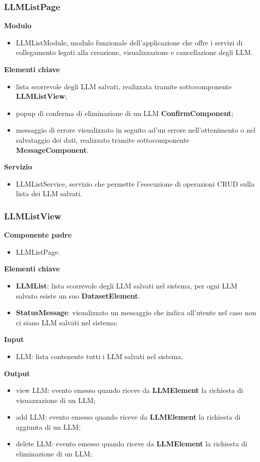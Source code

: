 \subsubsection{LLMListPage}
\textbf{Modulo}
\begin{itemize}
    \item LLMListModule, modulo funzionale dell'applicazione che offre i servizi di collegamento legati alla creazione, visualizzazione e cancellazione degli LLM. 
\end{itemize}
\textbf{Elementi chiave}
\begin{itemize}
    \item lista scorrevole degli LLM salvati, realizzata tramite sottocomponente \textbf{LLMListView};
    \item popup di conferma di eliminazione di un LLM \textbf{ConfirmComponent};
    \item messaggio di errore visualizzato in seguito ad'un errore nell'ottenimento o nel salvataggio dei dati, realizzato tramite sottocomponente \textbf{MessageComponent}.
\end{itemize}
\textbf{Servizio} \\
\begin{itemize}
    \item LLMListService, servizio che permette l'esecuzione di operazioni CRUD sulla lista dei LLM salvati.
\end{itemize}

\subsubsection{LLMListView}
\textbf{Componente padre}
\begin{itemize}
    \item LLMListPage.
\end{itemize}
\textbf{Elementi chiave}
\begin{itemize}
    \item \textbf{LLMList}: lista scorrevole degli LLM salvati nel sistema, per ogni LLM salvato esiste un suo \textbf{DatasetElement}.
    \item \textbf{StatusMessage}: visualizzato un messaggio che indica all'utente nel caso non ci siano LLM salvati nel sistema;
\end{itemize}
\textbf{Input}
\begin{itemize}
    \item LLM: lista contenente tutti i LLM salvati nel sistema.
\end{itemize}
\textbf{Output}
\begin{itemize}
    \item view LLM: evento emesso quando riceve da \textbf{LLMElement} la richiesta di visuazzazione di un LLM;
    \item add LLM: evento emesso quando riceve da \textbf{LLMElement} la richiesta di aggiunta di un LLM;
    \item delete LLM: evento emesso quando riceve da \textbf{LLMElement} la richiesta di eliminazione di un LLM;
\end{itemize}

